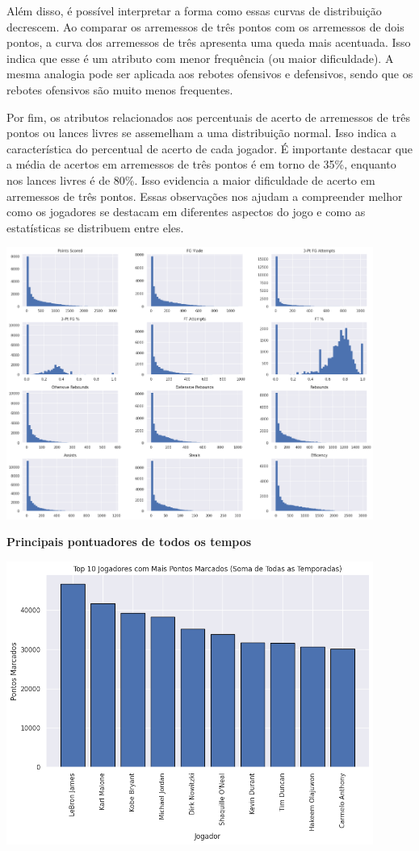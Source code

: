 \documentclass[
]{book}
\begin{document}
Além disso, é possível interpretar a forma como essas curvas de distribuição decrescem. Ao comparar os arremessos de três pontos com os arremessos de dois pontos, a curva dos arremessos de três apresenta uma queda mais acentuada. Isso indica que esse é um atributo com menor frequência (ou maior dificuldade). A mesma analogia pode ser aplicada aos rebotes ofensivos e defensivos, sendo que os rebotes ofensivos são muito menos frequentes.

Por fim, os atributos relacionados aos percentuais de acerto de arremessos de três pontos ou lances livres se assemelham a uma distribuição normal. Isso indica a característica do percentual de acerto de cada jogador. É importante destacar que a média de acertos em arremessos de três pontos é em torno de 35\%, enquanto nos lances livres é de 80\%. Isso evidencia a maior dificuldade de acerto em arremessos de três pontos. Essas observações nos ajudam a compreender melhor como os jogadores se destacam em diferentes aspectos do jogo e como as estatísticas se distribuem entre eles.

\includegraphics[width=0.9\textwidth,height=\textheight]{imagens/15.png}

\textbf{Principais pontuadores de todos os tempos}

\includegraphics[width=0.9\textwidth,height=\textheight]{imagens/16.png}
\end{document}
